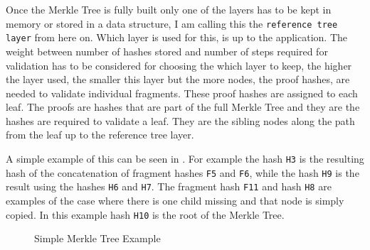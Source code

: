 Once the Merkle Tree is fully built only one of the layers has to be kept in memory or stored in a data structure, I am calling this the \texttt{reference tree layer} from here on. Which layer is used for this, is up to the application. The weight between number of hashes stored and number of steps required for validation has to be considered for choosing the which layer to keep, the higher the layer used, the smaller this layer but the more nodes, the proof hashes, are needed to validate individual fragments. These proof hashes are assigned to each leaf. The proofs are hashes that are part of the full Merkle Tree and they are the hashes are required to validate a leaf. They are the sibling nodes along the path from the leaf up to the reference tree layer.

A simple example of this can be seen in . For example the hash \texttt{H3} is the resulting hash of the concatenation of fragment hashes \texttt{F5} and \texttt{F6}, while the hash \texttt{H9} is the result using the hashes \texttt{H6} and \texttt{H7}. The fragment hash \texttt{F11} and hash \texttt{H8} are examples of the case where there is one child missing and that node is simply copied. In this example hash \texttt{H10} is the root of the Merkle Tree.

\begin{figure}
    \centering
    \caption{Simple Merkle Tree Example}
    \label{fig:merkle_example}
\end{figure}

